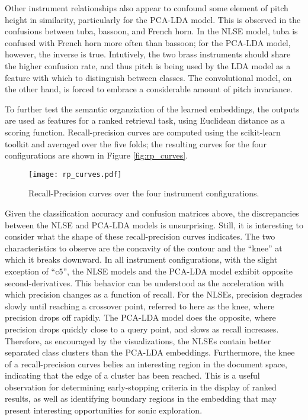 Other instrument relationships also appear to confound some element of pitch height in similarity, particularly for the PCA-LDA model.
This is observed in the confusions between tuba, bassoon, and French horn.
In the NLSE model, tuba is confused with French horn more often than bassoon; for the PCA-LDA model, however, the inverse is true.
Intutively, the two brass instruments should share the higher confusion rate, and thus pitch is being used by the LDA model as a feature with which to distinguish between classes.
The convolutional model, on the other hand, is forced to embrace a considerable amount of pitch invariance.



To further test the semantic organziation of the learned embeddings, the outputs are used as features for a ranked retrieval task, using Euclidean distance as a scoring function.
Recall-precision curves are computed using the scikit-learn toolkit and averaged over the five folds; the resulting curves for the four configurations are shown in Figure \ref{fig:rp_curves}.

\begin{figure}[h]
\centering
\texttt{[image: rp\_curves.pdf]}
\caption{Recall-Precision curves over the four instrument configurations.}
\label{fig:margins}
\end{figure}

Given the classification accuracy and confusion matrices above, the discrepancies between the NLSE and PCA-LDA models is unsurprising.
Still, it is interesting to consider what the shape of these recall-precision curves indicates.
The two characteristics to observe are the concavity of the contour and the ``knee'' at which it breaks downward.
In all instrument configurations, with the slight exception of ``c5'', the NLSE models and the PCA-LDA model exhibit opposite second-derivatives.
This behavior can be understood as the acceleration with which precision changes as a function of recall.
For the NLSEs, precision degrades slowly until reaching a crossover point, referred to here as the knee, where precision drops off rapidly.
The PCA-LDA model does the opposite, where precision drops quickly close to a query point, and slows as recall increases.
Therefore, as encouraged by the visualizations, the NLSEs contain better separated class clusters than the PCA-LDA embeddings.
Furthermore, the knee of a recall-precision curves belies an interesting region in the document space, indicating that the edge of a cluster has been reached.
This is a useful observation for determining early-stopping criteria in the display of ranked results, as well as identifying boundary regions in the embedding that may present interesting opportunities for sonic exploration.



